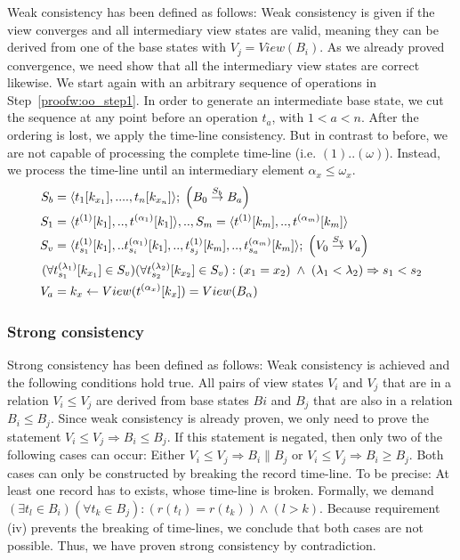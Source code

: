 Weak consistency has been defined as follows: Weak consistency is given 
if the view converges and all intermediary view states are valid, 
meaning they can be derived from one of the base states with 
$V_j=View(B_i)$. As we already proved convergence, we need show that all 
the intermediary view states are correct likewise. We start again with 
an arbitrary sequence of operations in Step~\ref{proofw:oo_step1}. In 
order to generate an intermediate base state, we cut the sequence at any 
point before an operation $t_a$, with $1 < a < n$. After the ordering is 
lost, we apply the time-line consistency. But in contrast to before, we 
are not capable of processing the complete time-line (i.e. 
$(1)..(\omega)$). Instead, we process the time-line until an 
intermediary element $\alpha_x \leq \omega_x$. 
%
\begin{subequations}
  \begin{align}
  S_b&=\langle t_1[k_{x_1}],....,t_n[k_{x_n}] \rangle;\;\Big(B_0 \overset{S_b}{\rightarrow}B_{a}\Big)\label{proofw:oo_step1}\\
 S_1&=\langle t^{(1)}[k_{1}],..,t^{(\alpha_1)}[k_{1}]\rangle,..,S_m=\langle t^{(1)}[k_{m}],..,t^{(\alpha_m)}[k_{m}]\rangle\\
 S_v&=\langle t_{s_1}^{(1)}[k_{1}],..t_{s_i}^{(\alpha_1)}[k_{1}],..,t_{s_j}^{(1)}[k_{m}],..,t_{s_a}^{(\alpha_m)}[k_{m}]\rangle;\;\Big(V_0\overset{S_v}{\rightarrow}V_a\Big)\\
 (\forall& t_{s_1}^{(\lambda_1)}[k_{x_1}] \in S_v)(\forall t_{s_2}^{(\lambda_2)}[k_{x_2}] \in S_v):(x_1=x_2)\;\land\;(\lambda_1<\lambda_2) \Rightarrow s_1 < s_2\notag\\
V_{a}&=k_x\leftarrow View(t^{(\alpha_x)}[k_x])=View(B_{\alpha})
  \end{align}
\end{subequations}


\subsubsection{Strong consistency}
\label{sub:proof_strong}

Strong consistency has been defined as follows: Weak consistency is 
achieved and the following conditions hold true. All pairs of view 
states $V_i$ and $V_j$ that are in a relation $V_i \leq V_j$ are derived 
from base states $Bi$ and $B_j$ that are also in a relation $B_i \leq 
B_j$. Since weak consistency is already proven, we only need to prove 
the statement $V_i \leq V_j \Rightarrow B_i \leq B_j$. If this statement 
is negated, then only two of the following cases can occur: Either $V_i 
\leq V_j \Rightarrow B_i \parallel B_j$ or $V_i \leq V_j \Rightarrow B_i 
\geq B_j$. Both cases can only be constructed by breaking the record 
time-line. To be precise: At least one record has to exists, whose 
time-line is broken. Formally, we demand $ (\exists t_l \in B_i)(\forall 
t_k \in B_j):(r(t_l)=r(t_k))\land(l > k) $. Because requirement (iv) 
prevents the breaking of time-lines, we conclude that both cases are not 
possible. Thus, we have proven strong consistency by contradiction. 
